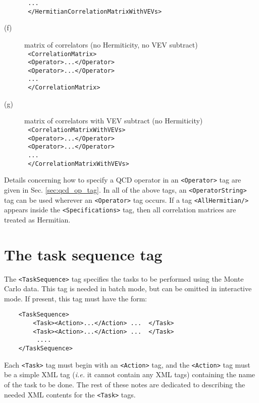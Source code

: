 \documentclass[12pt]{article}
\newcommand{\vb}{\texttt}
\begin{document}
\begin{description}
\hspace*{25pt}\texttt{                ...                 }\\            
\texttt{       </HermitianCorrelationMatrixWithVEVs> } 
\item[(f)]
 matrix of correlators (no Hermiticity, no VEV subtract)\\
\texttt{        <CorrelationMatrix>         }\\ 
\hspace*{15pt}\texttt{            <Operator>...</Operator> }\\
\hspace*{15pt}\texttt{            <Operator>...</Operator> }\\
\hspace*{25pt}\texttt{                 ...          }\\       
\texttt{        </CorrelationMatrix>  }      
\item[(g)]
 matrix of correlators with VEV subtract (no Hermiticity)\\
 \texttt{       <CorrelationMatrixWithVEVs>  }\\
\hspace*{15pt} \texttt{           <Operator>...</Operator> }\\
\hspace*{15pt} \texttt{           <Operator>...</Operator> }\\
\hspace*{25pt} \texttt{                ...                 }\\
 \texttt{       </CorrelationMatrixWithVEVs> }
\end{description}
Details concerning how to specify a QCD operator in an \vb{<Operator>}
tag are given in Sec. \ref{sec:qcd_op_tag}.  In all of the above tags, an
\vb{<OperatorString>} tag can be used wherever an \vb{<Operator>} tag occurs.
If a tag \vb{<AllHermitian/>} appears inside the \vb{<Specifications>}
tag, then all correlation matrices are treated as Hermitian.

\section{The task sequence tag}

The \vb{<TaskSequence>} tag specifies the tasks to be performed using the 
Monte Carlo data.  This tag is needed in batch mode, but 
can be omitted in interactive mode.  If present, this tag must have the form:
\begin{verbatim}
    <TaskSequence>
        <Task><Action>...</Action> ...  </Task>
        <Task><Action>...</Action> ...  </Task>
         .... 
    </TaskSequence>
\end{verbatim}
Each \vb{<Task>} tag must begin with an \vb{<Action>} tag, and
the \vb{<Action>} tag must be a simple XML tag (\textit{i.e.} it cannot contain
any XML tags) containing the name of the task to be done.
The rest of these notes are dedicated to describing the needed XML contents
for the \vb{<Task>} tags.
\end{document}

